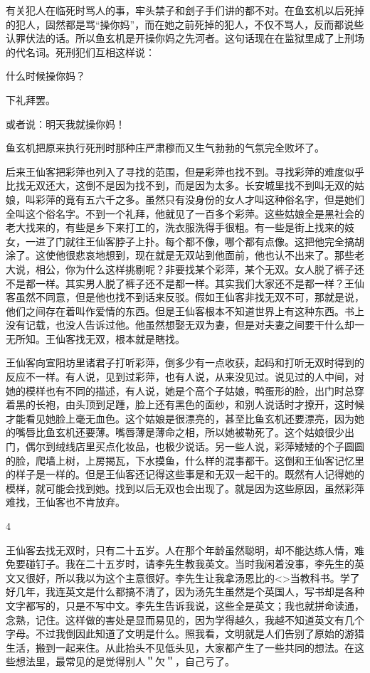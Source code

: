 有关犯人在临死时骂人的事，牢头禁子和刽子手们讲的都不对。在鱼玄机以后死掉的犯人，固然都是骂“操你妈”，而在她之前死掉的犯人，不仅不骂人，反而都说些认罪伏法的话。所以鱼玄机是开操你妈之先河者。这句话现在在监狱里成了上刑场的代名词。死刑犯们互相这样说： 

什么时候操你妈？ 

下礼拜罢。 

或者说：明天我就操你妈！ 

鱼玄机把原来执行死刑时那种庄严肃穆而又生气勃勃的气氛完全败坏了。 

后来王仙客把彩萍也列入了寻找的范围，但是彩萍也找不到。寻找彩萍的难度似乎比找无双还大，这倒不是因为找不到，而是因为太多。长安城里找不到叫无双的姑娘，叫彩萍的竟有五六千之多。虽然只有没身份的女人才叫这种俗名字，但是她们全叫这个俗名字。不到一个礼拜，他就见了一百多个彩萍。这些姑娘全是黑社会的老大找来的，有些是乡下来打工的，洗衣服洗得手很粗。有一些是街上找来的妓女，一进了门就往王仙客脖子上扑。每个都不像，哪个都有点像。这把他完全搞胡涂了。这使他很悲哀地想到，现在就是无双站到他面前，他也认不出来了。那些老大说，相公，你为什么这样挑剔呢？非要找某个彩萍，某个无双。女人脱了裤子还不是都一样。其实男人脱了裤子还不是都一样。其实我们大家还不是都一样？王仙客虽然不同意，但是他也找不到话来反驳。假如王仙客非找无双不可，那就是说，他们之间存在着叫作爱情的东西。但是王仙客根本不知道世界上有这种东西。书上没有记载，也没人告诉过他。他虽然想娶无双为妻，但是对夫妻之间要干什么却一无所知。王仙客找无双，根本就是瞎找。 

王仙客向宣阳坊里诸君子打听彩萍，倒多少有一点收获，起码和打听无双时得到的反应不一样。有人说，见到过彩萍，也有人说，从来没见过。说见过的人中间，对她的模样也有不同的描述，有人说，她是个高个子姑娘，鸭蛋形的脸，出门时总穿着黑的长袍，由头顶到足踵，脸上还有黑色的面纱，和别人说话时才撩开，这时候才能看见她脸上毫无血色。这个姑娘是很漂亮的，甚至比鱼玄机还要漂亮，因为她的嘴唇比鱼玄机还要薄。嘴唇薄是薄命之相，所以她被勒死了。这个姑娘很少出门，偶尔到绒线店里买点化妆品，也极少说话。另一些人说，彩萍矮矮的个子圆圆的脸，爬墙上树，上房揭瓦，下水摸鱼，什么样的混事都干。这倒和王仙客记忆里的样子是一样的。但是王仙客还记得这些事是和无双一起干的。既然有人记得她的模样，就可能会找到她。找到以后无双也会出现了。就是因为这些原因，虽然彩萍难找，王仙客也不肯放弃。 

4 

王仙客去找无双时，只有二十五岁。人在那个年龄虽然聪明，却不能达练人情，难免要碰钉子。我在二十五岁时，请李先生教我英文。当时我闲着没事，李先生的英文又很好，所以我以为这个主意很好。李先生让我拿汤恩比的<>当教科书。学了好几年，我连英文是什么都搞不清了，因为汤先生虽然是个英国人，写书却是各种文字都写的，只是不写中文。李先生告诉我说，这些全是英文；我也就拼命读通，念熟，记住。这样做的害处是显而易见的，因为学得越久，我越不知道英文有几个字母。不过我倒因此知道了文明是什么。照我看，文明就是人们告别了原始的游猎生活，搬到一起来住。从此抬头不见低头见，大家都产生了一些共同的想法。在这些想法里，最常见的是觉得别人＂欠＂，自己亏了。 

